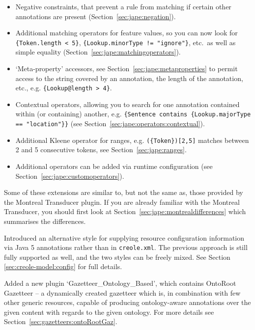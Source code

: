 \begin{itemize}
\item Negative constraints, that prevent a rule from matching if certain other
      annotations are present (Section~\ref{sec:jape:negation}).
\item Additional matching operators for feature values, so you can now look for
      \verb|{Token.length < 5}|, \verb|{Lookup.minorType != "ignore"}|, etc.~as
      well as simple equality (Section~\ref{sec:jape:matchingoperators}).
\item `Meta-property' accessors, see Section~\ref{sec:jape:metaproperties} to
permit access to the string covered by an annotation, the length of the annotation, etc., e.g.
      \verb|{Lookup@length > 4}|.
\item Contextual operators, allowing you to search for one annotation contained
      within (or containing) another, e.g.
      \verb|{Sentence contains {Lookup.majorType == "location"}}| (see
      Section~\ref{sec:jape:operators:contextual}).
\item Additional Kleene operator for ranges, e.g. \verb|({Token})[2,5]| matches
      between 2 and 5 consecutive tokens, see Section~\ref{sec:jape:ranges}.
\item Additional operators can be added via runtime configuration (see
Section~\ref{sec:jape:customoperators}).
\end{itemize}

Some of these extensions are similar to, but not the same as, those provided by
the Montreal Transducer plugin.  If you are already familiar with the Montreal
Transducer, you should first look at Section~\ref{sec:jape:montrealdifferences}
which summarises the differences.


Introduced an alternative style for supplying resource configuration
information via Java 5 annotations rather than in {\tt creole.xml}.  The
previous approach is still fully supported as well, and the two styles can be
freely mixed.  See Section \ref{sec:creole-model:config} for full details.


Added a new plugin `Gazetteer\_Ontology\_Based', which contains OntoRoot
Gazetteer -- a dynamically created gazetteer which is, in combination with few
other generic resources, capable of producing ontology-aware annotations
over the given content with regards to the given ontology. For more details see
Section~\ref{sec:gazetteers:ontoRootGaz}.

